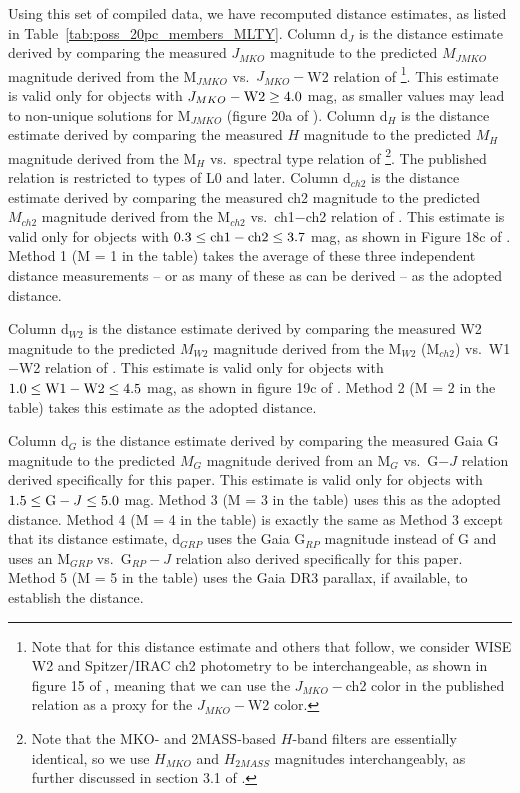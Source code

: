 \documentclass[twocolumn,tighten,twocolappendix]{aastex631}
\begin{document}
Using this set of compiled data, we have recomputed distance estimates, as listed in Table~\ref{tab:poss_20pc_members_MLTY}. Column d$_J$ is the distance estimate derived by comparing the measured $J_{MKO}$ magnitude to the predicted $M_{JMKO}$ magnitude derived from the M$_{JMKO}$ vs.\ $J_{MKO}-$W2 relation of \cite{kirkpatrick2021}\footnote{Note that for this distance estimate and others that follow, we consider WISE W2 and Spitzer/IRAC ch2 photometry to be interchangeable, as shown in figure 15 of \citealt{kirkpatrick2021}, meaning that we can use the $J_{MKO}-$ch2 color in the published relation as a proxy for the $J_{MKO}-$W2 color.}. This estimate is valid only for objects with $J_{MKO}-{\rm W2} \ge 4.0$ mag, as smaller values may lead to non-unique solutions for M$_{JMKO}$ (figure 20a of \citealt{kirkpatrick2021}). Column d$_H$ is the distance estimate derived by comparing the measured $H$ magnitude to the predicted $M_{H}$ magnitude derived from the M$_H$ vs.\ spectral type relation of \cite{kirkpatrick2021}\footnote{Note that the MKO- and 2MASS-based $H$-band filters are essentially identical, so we use $H_{MKO}$ and $H_{2MASS}$ magnitudes interchangeably, as further discussed in section 3.1 of \citealt{kirkpatrick2011}.}. The published relation is restricted to types of L0 and later. Column d$_{ch2}$ is the distance estimate derived by comparing the measured ch2 magnitude to the predicted $M_{ch2}$ magnitude derived from the M$_{ch2}$ vs.\ ch1$-$ch2 relation of \cite{kirkpatrick2021}. This estimate is valid only for objects with $0.3 \le {\rm ch1}-{\rm ch2} \le 3.7$ mag, as shown in Figure 18c of \cite{kirkpatrick2021}. Method 1 (M = 1 in the table) takes the average of these three independent distance measurements -- or as many of these as can be derived -- as the adopted distance.

Column d$_{W2}$ is the distance estimate derived by comparing the measured W2 magnitude to the predicted $M_{W2}$ magnitude derived from the M$_{W2}$ (M$_{ch2}$) vs.\ W1$-$W2 relation of \cite{kirkpatrick2021}. This estimate is valid only for objects with $1.0 \le {\rm W1}-{\rm W2} \le 4.5$ mag, as shown in figure 19c of \cite{kirkpatrick2021}. Method 2 (M = 2 in the table) takes this estimate as the adopted distance. 

Column d$_{G}$ is the distance estimate derived by comparing the measured Gaia G magnitude to the predicted $M_{G}$ magnitude derived from an M$_{G}$ vs.\ G$-J$ relation derived specifically for this paper. This estimate is valid only for objects with $1.5 \le {\rm G}-J \le 5.0$ mag. Method 3 (M = 3 in the table) uses this as the adopted distance. Method 4 (M = 4 in the table) is exactly the same as Method 3 except that its distance estimate, d$_{GRP}$ uses the Gaia G$_{RP}$ magnitude instead of G and uses an M$_{GRP}$ vs.\ G$_{RP}-J$ relation also derived specifically for this paper. Method 5 (M = 5 in the table) uses the Gaia DR3 parallax, if available, to establish the distance.
\end{document}
